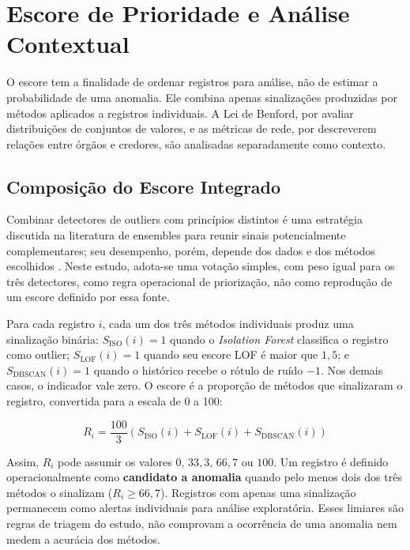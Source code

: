 \documentclass[
    12pt,               %
    openright,          %
    oneside,            %
    a4paper,            %
    chapter=TITLE,      %
    sumario=tradicional,%
    english,            %
    brazilian,          %
 ]{abntex2}
\begin{document}
\section{Escore de Prioridade e Análise Contextual}\label{sec:escore_risco_validacao}

O escore tem a finalidade de ordenar registros para análise, não de estimar a probabilidade de uma anomalia. Ele combina apenas sinalizações produzidas por métodos aplicados a registros individuais. A Lei de Benford, por avaliar distribuições de conjuntos de valores, e as métricas de rede, por descreverem relações entre órgãos e credores, são analisadas separadamente como contexto.

\subsection{Composição do Escore Integrado}\label{subsec:composicao_escore}

Combinar detectores de outliers com princípios distintos é uma estratégia discutida na literatura de ensembles para reunir sinais potencialmente complementares; seu desempenho, porém, depende dos dados e dos métodos escolhidos \cite{aggarwal_sathe2017}. Neste estudo, adota-se uma votação simples, com peso igual para os três detectores, como regra operacional de priorização, não como reprodução de um escore definido por essa fonte.

Para cada registro $i$, cada um dos três métodos individuais produz uma sinalização binária: $S_{\text{ISO}}(i)=1$ quando o \textit{Isolation Forest} classifica o registro como outlier; $S_{\text{LOF}}(i)=1$ quando seu escore LOF é maior que $1,5$; e $S_{\text{DBSCAN}}(i)=1$ quando o histórico recebe o rótulo de ruído $-1$. Nos demais casos, o indicador vale zero. O escore é a proporção de métodos que sinalizaram o registro, convertida para a escala de 0 a 100:

\begin{equation}\label{eq:escore_risco}
R_i = \frac{100}{3}\left(S_{\text{ISO}}(i) + S_{\text{LOF}}(i) + S_{\text{DBSCAN}}(i)\right)
\end{equation}

Assim, $R_i$ pode assumir os valores $0$, $33,3$, $66,7$ ou $100$. Um registro é definido operacionalmente como \textbf{candidato a anomalia} quando pelo menos dois dos três métodos o sinalizam ($R_i \geq 66,7$). Registros com apenas uma sinalização permanecem como alertas individuais para análise exploratória. Esses limiares são regras de triagem do estudo, não comprovam a ocorrência de uma anomalia nem medem a acurácia dos métodos.
\end{document}
